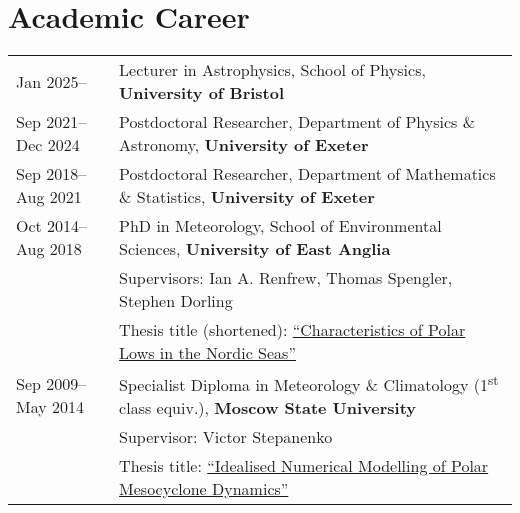 \documentclass[a4paper, 11pt]{article}
\begin{document}
\section{Academic Career}
\begin{tabularx}{\linewidth}{@{}l X@{}}
Jan 2025--         & Lecturer in Astrophysics, School of Physics, \textbf{University of Bristol} \\
Sep 2021--Dec 2024 & Postdoctoral Researcher, Department of Physics \& Astronomy, \textbf{University of Exeter} \\
Sep 2018--Aug 2021 & Postdoctoral Researcher, Department of Mathematics \& Statistics, \textbf{University of Exeter} \\
Oct 2014--Aug 2018 & PhD in Meteorology, School of Environmental Sciences, \textbf{University of East Anglia} \\
& Supervisors: Ian A. Renfrew, Thomas Spengler, Stephen Dorling \\
& Thesis title (shortened): \href{https://ueaeprints.uea.ac.uk/id/eprint/68204/}{``Characteristics of Polar Lows in the Nordic Seas''} \\ %
Sep 2009--May 2014 & Specialist Diploma in Meteorology \& Climatology (1\textsuperscript{st} class equiv.), \textbf{Moscow State University}  \\
& Supervisor: Victor Stepanenko \\
& Thesis title: \href{https://figshare.com/articles/thesis/SergeevDE_diploma_pdf/5326846/1}{``Idealised Numerical Modelling of Polar Mesocyclone Dynamics''}\\
\end{tabularx}

\end{document}

